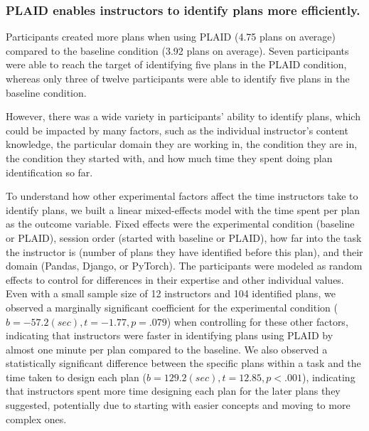 \subsubsection{PLAID enables instructors to identify plans more efficiently.}
Participants created more plans when using PLAID (4.75 plans on average) compared to the baseline condition (3.92 plans on average).
Seven participants were able to reach the target of identifying five plans in the PLAID condition, whereas only three of twelve participants were able to identify five plans in the baseline condition.



However, there was a wide variety in participants' ability to identify plans, which could be impacted by many factors, such as the individual instructor's content knowledge, the particular domain they are working in, the condition they are in, the condition they started with, and how much time they spent doing plan identification so far.

To understand how other experimental factors affect the time instructors take to identify plans, we built a linear mixed-effects model with the time spent per plan as the outcome variable. Fixed effects were the experimental condition (baseline or PLAID), session order (started with baseline or PLAID), how far into the task the instructor is (number of plans they have identified before this plan), and their domain (Pandas, Django, or PyTorch). The participants were modeled as random effects to control for differences in their expertise and other individual values. Even with a small sample size of 12 instructors and 104 identified plans, we observed a marginally significant coefficient for the experimental condition ($b = -57.2 (sec), t=-1.77, p = .079$) when controlling for these other factors, indicating that instructors were faster in identifying plans using PLAID by almost one minute per plan compared to the baseline. We also observed a statistically significant difference between the specific plans within a task and the time taken to design each plan ($b=129.2 (sec), t=12.85, p < .001$), indicating that instructors spent more time designing each plan for the later plans they suggested, potentially due to starting with easier concepts and moving to more complex ones.

